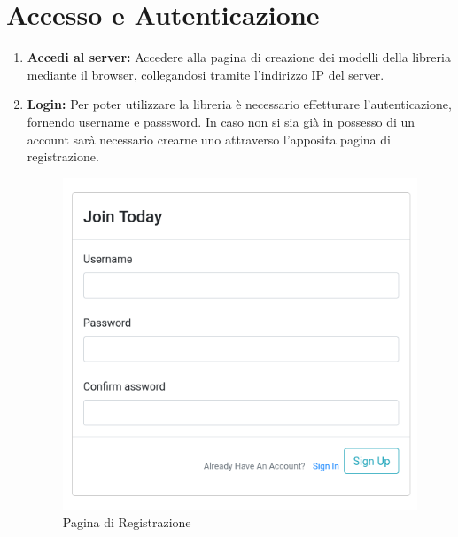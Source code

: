 \documentclass{rapportECL}
\begin{document}
\section{Accesso e Autenticazione}
\begin{enumerate}
  \item \textbf{Accedi al server:} Accedere alla pagina di creazione dei modelli della libreria mediante il browser, collegandosi tramite l'indirizzo IP del server.

  \item \textbf{Login:} Per poter utilizzare la libreria è necessario effetturare l'autenticazione, fornendo username e passsword. In caso non si sia già in possesso
  di un account sarà necessario crearne uno attraverso l'apposita pagina di registrazione. 

  \begin{figure}[htp]
    \begin{minipage}[b]{0.5\linewidth}
      \centering
      \includegraphics[width=\linewidth]{images/img2.png}
      \caption{Pagina di Registrazione}
    \end{minipage}
    \hspace{0.5cm}
    \begin{minipage}[b]{0.5\linewidth}
      \centering

\end{minipage}
\end{figure}
\end{enumerate}
\end{document}
